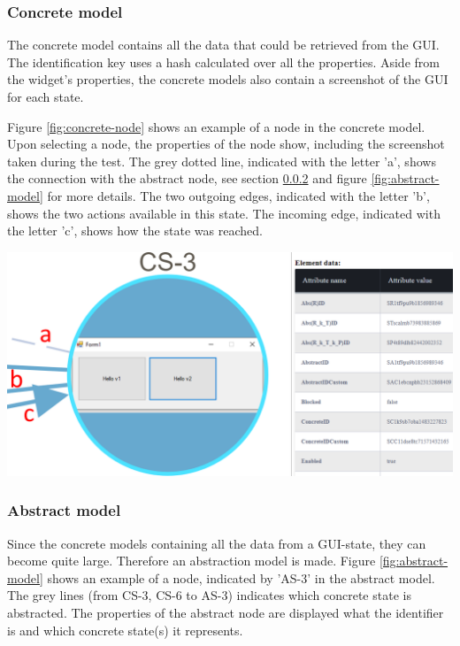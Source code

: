 \subsubsection{Concrete model}
The concrete model contains all the data that could be retrieved from the GUI. The identification key uses a hash calculated over all the properties. Aside from the widget's properties, the concrete models also contain a screenshot of the GUI for each state.

Figure \ref{fig:concrete-node} shows an example of a node in the concrete model. Upon selecting a node, the properties of the node show, including the screenshot taken during the test. The grey dotted line, indicated with the letter 'a', shows the connection with the abstract node, see section \ref{abstract-model} and figure \ref{fig:abstract-model} for more details. The two outgoing edges, indicated with the letter 'b', shows the two actions available in this state. The incoming edge, indicated with the letter 'c', shows how the state was reached. 

\bigskip
\begingroup
\captionsetup{type=figure}
\includegraphics[scale=0.5]{pics/concrete-model.png}
\label{fig:concrete-node}
\endgroup

\subsubsection{Abstract model} \label{abstract-model}
Since the concrete models containing all the data from a GUI-state, they can become quite large.  Therefore an abstraction model is made. Figure \ref{fig:abstract-model} shows an example of a node, indicated by 'AS-3'  in the abstract model. The grey lines (from CS-3, CS-6 to AS-3) indicates which concrete state is abstracted. The properties of the abstract node are displayed what the identifier is and which concrete state(s) it represents.

